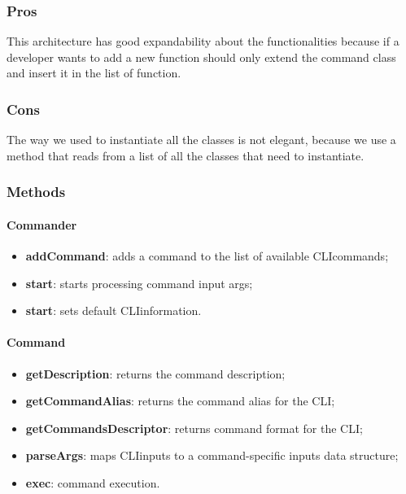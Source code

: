 \subsubsection{Pros}
This architecture has good expandability about the functionalities because if a developer wants to add a new function should only extend the command class and insert it in the list of function.
\subsubsection{Cons}
The way we used to instantiate all the classes is not elegant, because we use a method that reads from a list of all the classes that need to instantiate.

\subsubsection{Methods}
\paragraph{Commander}
\begin{itemize}
    \item \textbf{addCommand}: adds a command to the list of available CLI\glo commands;
    \item \textbf{start}: starts processing command input args;
    \item \textbf{start}: sets default CLI\glo information.
\end{itemize}
\paragraph{Command}
\begin{itemize}
    \item \textbf{getDescription}: returns the command description;
    \item \textbf{getCommandAlias}: returns the command alias for the CLI\glo;
    \item \textbf{getCommandsDescriptor}: returns command format for the CLI\glo;
    \item \textbf{parseArgs}: maps CLI\glo inputs to a command-specific inputs data structure;
    \item \textbf{exec}: command execution.
\end{itemize}
